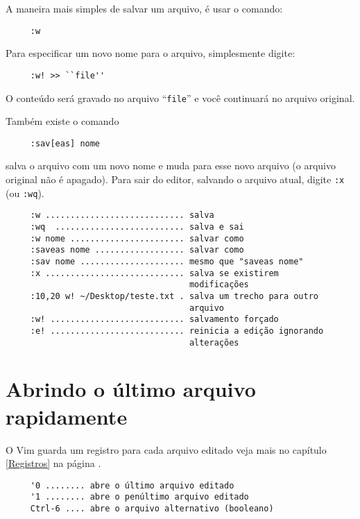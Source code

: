 A maneira mais simples de salvar um arquivo, é usar o comando:

\begin{verbatim}
     :w
\end{verbatim}


Para especificar um novo nome para o arquivo, simplesmente digite:

\begin{verbatim}
     :w! >> ``file''
\end{verbatim}

O conteúdo será gravado no arquivo ``{\tt file}'' e você continuará no arquivo original.

Também existe o comando

\begin{verbatim}
     :sav[eas] nome
\end{verbatim}

salva o arquivo com um novo nome e muda para esse novo arquivo (o arquivo
original não é apagado).  Para sair do editor, salvando o arquivo atual, digite
{\tt :x} (ou {\tt :wq}).

\begin{verbatim}
     :w ............................ salva
     :wq  .......................... salva e sai
     :w nome ....................... salvar como
     :saveas nome .................. salvar como
     :sav nome ..................... mesmo que "saveas nome"
     :x ............................ salva se existirem 
                                     modificações
     :10,20 w! ~/Desktop/teste.txt . salva um trecho para outro 
                                     arquivo
     :w! ........................... salvamento forçado
     :e! ........................... reinicia a edição ignorando 
                                     alterações
\end{verbatim}


\section{Abrindo o último arquivo rapidamente}

O Vim guarda um registro para cada arquivo editado veja
mais no capítulo \ref{Registros} na página \pageref{Registros}.

\begin{verbatim}
     '0 ........ abre o último arquivo editado
     '1 ........ abre o penúltimo arquivo editado
     Ctrl-6 .... abre o arquivo alternativo (booleano)
\end{verbatim}

